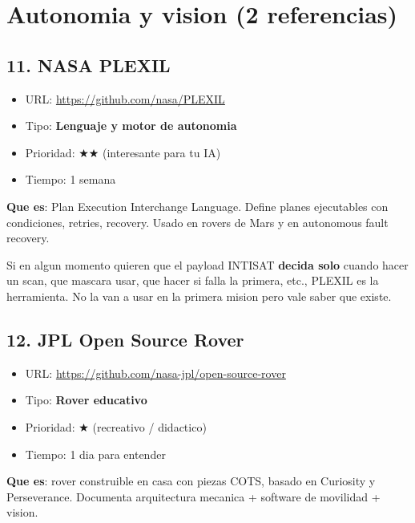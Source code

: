 \documentclass[11pt,a4paper,oneside]{report}
\begin{document}
\chapter{Autonomia y vision (2 referencias)}

\section{11. NASA PLEXIL}

\begin{itemize}[leftmargin=1.5em]
  \item URL: \url{https://github.com/nasa/PLEXIL}
  \item Tipo: \textbf{Lenguaje y motor de autonomia}
  \item Prioridad: $\bigstar\bigstar$ (interesante para tu IA)
  \item Tiempo: 1 semana
\end{itemize}

\textbf{Que es}: Plan Execution Interchange Language. Define planes
ejecutables con condiciones, retries, recovery. Usado en rovers de Mars y
en autonomous fault recovery.

\begin{nota}
Si en algun momento quieren que el payload INTISAT \textbf{decida solo}
cuando hacer un scan, que mascara usar, que hacer si falla la primera, etc.,
PLEXIL es la herramienta. No la van a usar en la primera mision pero vale
saber que existe.
\end{nota}

\section{12. JPL Open Source Rover}

\begin{itemize}[leftmargin=1.5em]
  \item URL: \url{https://github.com/nasa-jpl/open-source-rover}
  \item Tipo: \textbf{Rover educativo}
  \item Prioridad: $\bigstar$ (recreativo / didactico)
  \item Tiempo: 1 dia para entender
\end{itemize}

\textbf{Que es}: rover construible en casa con piezas COTS, basado en
Curiosity y Perseverance. Documenta arquitectura mecanica + software de
movilidad + vision.
\end{document}

